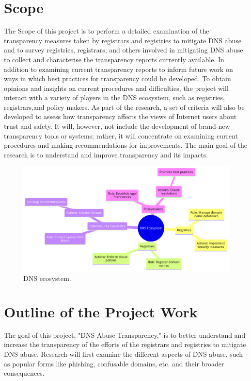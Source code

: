 \section{Scope}	
The Scope of this project is to perform a detailed examination of the transparency measures taken by registrars and registries to mitigate DNS abuse and to survey registries, registrars, and others involved in mitigating DNS abuse to collect and characterise the transparency reports currently available. In addition to examining current transparency reports to inform future work on ways in which best practices for transparency could be developed. To obtain opinions and insights on current procedures and difficulties, the project will interact with a variety of players in the DNS ecosystem, such as registries, registrars,and policy makers. As part of the research, a set of criteria will also be developed to assess how transparency affects the views of Internet users about trust and safety. It will, however, not include the development of brand-new transparency tools or systems; rather, it will concentrate on examining current procedures and making recommendations for improvements. The main goal of the research is to understand and improve transparency and its impacts. 

\begin{figure}[H]
    \centering
    \includegraphics[width=\linewidth]{introduction/diagram (8).png}
    \caption{ DNS ecosystem.}
    \label{fig:dnsintrointro}
\end{figure}

\section{ Outline of the Project Work} 
The goal of this project, "DNS Abuse Transparency," is to better understand and increase the transparency of the efforts of the registrars and registries to mitigate DNS abuse. Research will first examine the different aspects of DNS abuse, such as popular forms like phishing, confusable domains, etc. and their broader consequences. 

